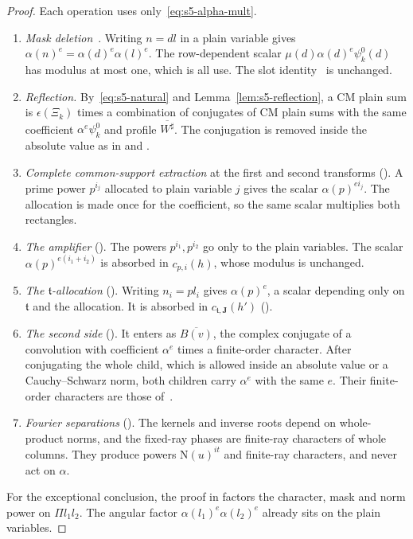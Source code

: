 \documentclass[11pt]{article}
\numberwithin{equation}{section}
\newcommand{\N}{\mathrm N}
\begin{document}
\begin{proof}
Each operation uses only~\eqref{eq:s5-alpha-mult}.
\begin{enumerate}
\item[(i)] \emph{Mask deletion}~\cite[eq.~(18.4)]{OAI78}. Writing $n=dl$ in a plain variable gives
 $\alpha(n)^e=\alpha(d)^e\alpha(l)^e$. The row-dependent scalar $\mu(d)\alpha(d)^e\psi_k^0(d)$ has modulus
 at most one, which is all \cite[Section~18.1]{OAI78} use. The slot identity~\cite[eq.~(18.5)]{OAI78} is
 unchanged.
\item[(ii)] \emph{Reflection.} By~\eqref{eq:s5-natural} and Lemma~\ref{lem:s5-reflection}, a CM plain sum
 is $\epsilon(\Xi_k)$ times a combination of conjugates of CM plain sums with the same coefficient
 $\alpha^e\psi_k^0$ and profile $\overline{W^\sharp}$. The conjugation is removed inside the absolute value
 as in \cite[Section~18.1]{OAI78} and \cite[Section~4.1]{OAI78}.
\item[(iii)] \emph{Complete common-support extraction} at the first and second transforms
 (\cite[Sections~18.4 and~18.6]{OAI78}). A prime power $p^{i_j}$ allocated to plain variable $j$ gives the scalar
 $\alpha(p)^{ei_j}$. The allocation is made once for the coefficient, so the same scalar multiplies both
 rectangles.
\item[(iv)] \emph{The amplifier} (\cite[Section~18.5]{OAI78}). The powers $p^{i_1},p^{i_2}$ go only to the plain
 variables. The scalar $\alpha(p)^{e(i_1+i_2)}$ is absorbed in $c_{p,i}(h)$, whose modulus is unchanged.
\item[(v)] \emph{The $\mathfrak t$-allocation} (\cite[Section~18.6]{OAI78}). Writing $n_i=pl_i$ gives $\alpha(p)^e$, a
 scalar depending only on $\mathfrak t$ and the allocation. It is absorbed in $c_{\mathfrak t,\mathbf J}(h')$
 (\cite[Section~18.7]{OAI78}).
\item[(vi)] \emph{The second side} (\cite[Section~18.6]{OAI78}). It enters as $\overline{B(v)}$, the complex conjugate of
 a convolution with coefficient $\alpha^e$ times a finite-order character. After conjugating the whole
 child, which is allowed inside an absolute value or a Cauchy--Schwarz norm, both children carry
 $\alpha^e$ with the same $e$. Their finite-order characters are those of~\cite{OAI78}.
\item[(vii)] \emph{Fourier separations} (\cite[Sections~18.4 and~18.6]{OAI78}). The kernels and inverse roots
 depend on whole-product norms, and the fixed-ray phases are finite-ray characters of whole columns. They
 produce powers $\N(u)^{it}$ and finite-ray characters, and never act on $\alpha$.
\end{enumerate}
For the exceptional conclusion, the proof in \cite[proof of Lemma~18.2]{OAI78} factors the character, mask and norm power on
$\Pi l_1l_2$. The angular factor $\alpha(l_1)^e\alpha(l_2)^e$ already sits on the plain variables.
\end{proof}
\end{document}
